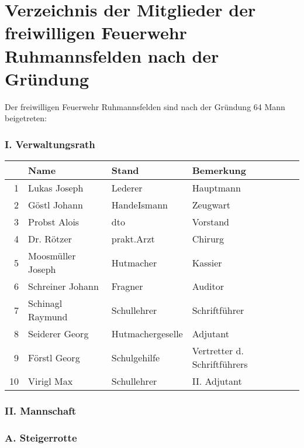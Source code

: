 \documentclass[12pt,a4paper]{book}
\begin{document}
\chapter[Verzeichnis der Mitglieder]{Verzeichnis der Mitglieder der
freiwilligen Feuerwehr Ruhmannsfelden nach der Gründung}

Der freiwilligen Feuerwehr Ruhmannsfelden sind nach der Gründung 64 Mann
beigetreten:

\subsection*{I. Verwaltungsrath}

\begin{tabular}{rlll}
& Name & Stand & Bemerkung\\
\hline
1 & Lukas Joseph & Lederer & Hauptmann\\
2 & Göstl Johann & HandeIsmann & Zeugwart\\
3 & Probst Alois & dto & Vorstand\\
4 & Dr. Rötzer & prakt.Arzt & Chirurg\\
5 & Moosmüller Joseph & Hutmacher & Kassier\\
6 & Schreiner Johann & Fragner & Auditor\\
7 & Schinagl Raymund & Schullehrer & Schriftführer\\
8 & Seiderer Georg & Hutmachergeselle & Adjutant\\
9 & Förstl Georg & Schulgehilfe & Vertretter d. Schriftführers\\
10 & Virigl Max & Schullehrer & II. Adjutant\\
\end{tabular}

\subsection*{II. Mannschaft}

\subsection*{A. Steigerrotte}
\end{document}
